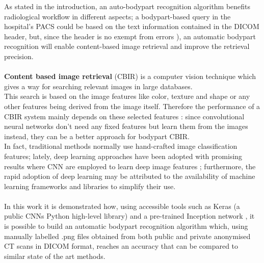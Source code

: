 \documentclass[../main.tex]{subfiles}
\begin{document}
As stated in the introduction, an auto-bodypart recognition algorithm benefits radiological workflow in different aspects; a bodypart-based query in the hospital's PACS could be based on the text information contained in the DICOM header, but, since the header is no exempt from errors  \cite{Yan2016}), an automatic bodypart recognition will enable content-based image retrieval and improve the retrieval precision. \cite{Yan2016} \\ \\
\textbf{Content based image retrieval} (CBIR) is a computer vision technique which gives a way for searching relevant images in large databases.  \\This search is based on the image features like color, texture and shape or any other features being derived from the image itself. Therefore the performance of a CBIR system mainly depends on these selected features \cite{Qayyum2017}: since convolutional neural networks don't need any fixed features but learn them from the images instead, they can be a better approach for bodypart CBIR.\\
In fact, traditional methods normally use hand-crafted image classification features; lately, deep learning approaches have been adopted with promising results where CNN are employed to learn deep image features \cite{Yan2018}; furthermore, the rapid adoption of deep learning may be attributed to the availability of machine learning frameworks and libraries to simplify their use. \cite{Lakhani2018} \\ \\
In this work it is demonstrated how, using accessible tools such as Keras (a public CNNs Python high-level library) and a pre-trained Inception network \cite{Lakhani2018}, it is possible to build an automatic bodypart recognition algorithm which, using manually labelled .png files obtained from both public and private anonymised CT scans in DICOM format, reaches an accuracy that can be compared to similar state of the art methods. \cite{Qayyum2017} \cite{Yan2016} \cite{Yan2018} \cite{Wang}

\end{document}
